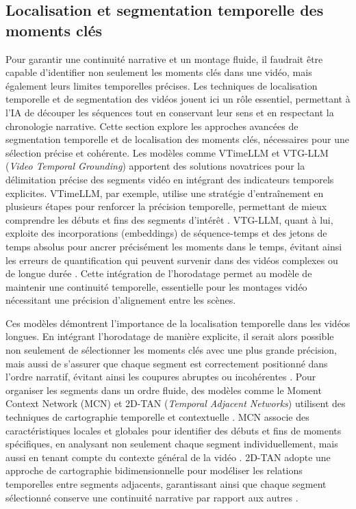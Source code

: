 \subsection{Localisation et segmentation temporelle des moments clés}
Pour garantir une continuité narrative et un montage fluide, il faudrait être capable d’identifier non seulement les moments clés dans une vidéo, mais également leurs limites temporelles précises. Les techniques de localisation temporelle et de segmentation des vidéos jouent ici un rôle essentiel, permettant à l’IA de découper les séquences tout en conservant leur sens et en respectant la chronologie narrative. Cette section explore les approches avancées de segmentation temporelle et de localisation des moments clés, nécessaires pour une sélection précise et cohérente. Les modèles comme VTimeLLM \cite{huang2024_vtimellm} et VTG-LLM (\textit{Video Temporal Grounding}) \cite{guo2024_vtgllm} apportent des solutions novatrices pour la délimitation précise des segments vidéo en intégrant des indicateurs temporels explicites. VTimeLLM, par exemple, utilise une stratégie d’entraînement en plusieurs étapes pour renforcer la précision temporelle, permettant de mieux comprendre les débuts et fins des segments d’intérêt \cite{han2024_clip}\cite{lei2021_clipbert}. VTG-LLM, quant à lui, exploite des incorporations (embeddings) de séquence-temps et des jetons de temps absolus pour ancrer précisément les moments dans le temps, évitant ainsi les erreurs de quantification qui peuvent survenir dans des vidéos complexes ou de longue durée \cite{guo2024_vtgllm}\cite{you2023_ferret}. Cette intégration de l’horodatage permet au modèle de maintenir une continuité temporelle, essentielle pour les montages vidéo nécessitant une précision d’alignement entre les scènes.

Ces modèles démontrent l’importance de la localisation temporelle dans les vidéos longues. En intégrant l’horodatage de manière explicite, il serait alors possible non seulement de sélectionner les moments clés avec une plus grande précision, mais aussi de s’assurer que chaque segment est correctement positionné dans l’ordre narratif, évitant ainsi les coupures abruptes ou incohérentes \cite{lei2021_clipbert}\cite{anonymous2017_localizing}. Pour organiser les segments dans un ordre fluide, des modèles comme le Moment Context Network (MCN) et 2D-TAN (\textit{Temporal Adjacent Networks}) utilisent des techniques de cartographie temporelle et contextuelle \cite{ghosh2019_excl}\cite{zhang2016_lstm}. MCN associe des caractéristiques locales et globales pour identifier des débuts et fins de moments spécifiques, en analysant non seulement chaque segment individuellement, mais aussi en tenant compte du contexte général de la vidéo \cite{zhang2016_lstm}\cite{zhang2019_memory}. 2D-TAN adopte une approche de cartographie bidimensionnelle pour modéliser les relations temporelles entre segments adjacents, garantissant ainsi que chaque segment sélectionné conserve une continuité narrative par rapport aux autres \cite{prabhu2017_retrieval}\cite{zhang2020_temporal}.

